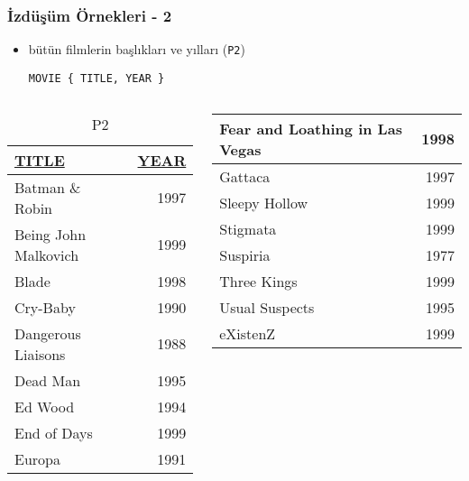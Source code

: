 \documentclass[dvipsnames]{beamer}
\theoremstyle{plain}
\begin{document}
\begin{frame}[fragile]
  \frametitle{İzdüşüm Örnekleri - 2}

    \begin{itemize}
      \item bütün filmlerin başlıkları ve yılları (\texttt{P2})
    \begin{lstlisting}
MOVIE { TITLE, YEAR }
    \end{lstlisting}
    \end{itemize}

    \vspace{-10pt}
    \begin{columns}[b]
      \begin{tiny}
      \begin{table}
        \caption{P2}
        \begin{tabular}{|l|r|}\hline
\underline{TITLE}              & \underline{YEAR}\\[2pt]\hline\hline
Batman \& Robin                & 1997\\\hline
Being John Malkovich           & 1999\\\hline
Blade                          & 1998\\\hline
Cry-Baby                       & 1990\\\hline
Dangerous Liaisons             & 1988\\\hline
Dead Man                       & 1995\\\hline
Ed Wood                        & 1994\\\hline
End of Days                    & 1999\\\hline
Europa                         & 1991\\\hline
        \end{tabular}
      \end{table}
      \end{tiny}

      \begin{tiny}
      \begin{table}
        \begin{tabular}{|l|r|}\hline
Fear and Loathing in Las Vegas & 1998\\\hline
Gattaca                        & 1997\\\hline
Sleepy Hollow                  & 1999\\\hline
Stigmata                       & 1999\\\hline
Suspiria                       & 1977\\\hline
Three Kings                    & 1999\\\hline
Usual Suspects                 & 1995\\\hline
eXistenZ                       & 1999\\\hline
        \end{tabular}
      \end{table}
      \end{tiny}
    \end{columns}
\end{frame}
\end{document}
